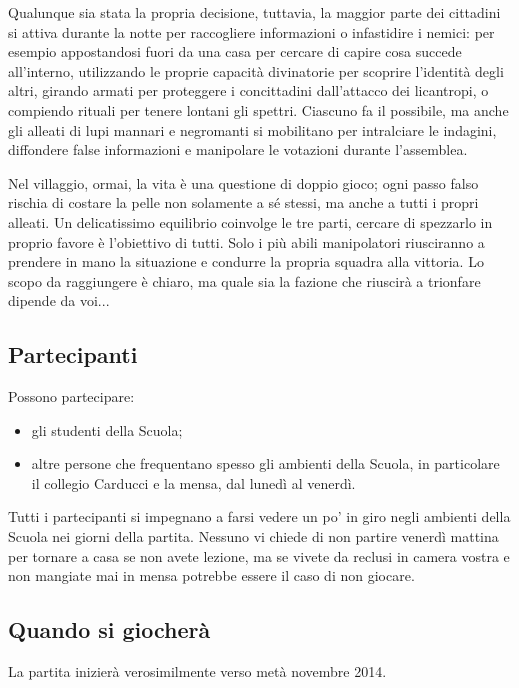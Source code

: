 \documentclass[a4paper,10pt]{article}
\begin{document}
Qualunque sia stata la propria decisione, tuttavia, la maggior parte dei
cittadini si attiva durante la notte per raccogliere informazioni o infastidire
i nemici: per esempio appostandosi fuori da una casa per cercare di capire cosa
succede all'interno, utilizzando le proprie capacità divinatorie per scoprire
l'identità degli altri, girando armati per proteggere i concittadini
dall'attacco dei licantropi, o compiendo rituali per tenere lontani gli spettri.
Ciascuno fa il possibile, ma anche gli alleati di lupi mannari e negromanti si
mobilitano per intralciare le indagini, diffondere false informazioni e
manipolare le votazioni durante l'assemblea.

Nel villaggio, ormai, la vita è una questione di doppio gioco; ogni passo falso
rischia di costare la pelle non solamente a sé stessi, ma anche a tutti i propri
alleati. Un delicatissimo equilibrio coinvolge le tre parti, cercare di
spezzarlo in proprio favore è l'obiettivo di tutti. Solo i più abili
manipolatori riusciranno a prendere in mano la situazione e condurre la
propria squadra alla vittoria. Lo scopo da raggiungere è chiaro, ma quale sia la
fazione che riuscirà a trionfare dipende da voi...



\subsection{Partecipanti}
Possono partecipare:
\begin{itemize}
 \item gli studenti della Scuola;
 \item altre persone che frequentano spesso gli ambienti della Scuola, in
particolare il collegio Carducci e la mensa, dal lunedì al venerdì.
\end{itemize}
Tutti i partecipanti si impegnano a farsi vedere un po' in giro negli ambienti
della Scuola nei giorni della partita. Nessuno vi chiede di non partire venerdì
mattina per tornare a casa se non avete lezione, ma se vivete da reclusi in
camera vostra e non mangiate mai in mensa potrebbe essere il caso di non
giocare.


\subsection{Quando si giocherà}

La partita inizierà verosimilmente verso metà novembre 2014.
\end{document}
